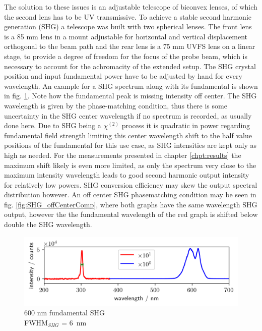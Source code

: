 \documentclass[twoside,openright]{scrreprt}
\begin{document}
The solution to these issues is an adjustable telescope of biconvex lenses, of which the second lens has to be UV transmissive. To achieve a stable second harmonic generation (SHG) a telescope was built with two spherical lenses. The front lens is a 85 mm lens in a mount adjustable for horizontal and vertical displacement orthogonal to the beam path and the rear lens is a 75 mm UVFS lens on a linear stage, to provide a degree of freedom for the focus of the probe beam, which is necessary to account for the achromacity of the extended setup. The SHG crystal position and input fundamental power have to be adjusted by hand for every wavelength. An example for a SHG spectrum along with its fundamental is shown in fig. \ref{fig:specSHG300nm}. Note how the fundamental peak is missing intensity off center. The SHG wavelength is given by the phase-matching condition, thus there is some uncertainty in the SHG center wavelength if no spectrum is recorded, as usually done here. Due to SHG being a $\chi^{\left(2\right)}$ process it is quadratic in power regarding fundamental field strength limiting this center wavelength shift to the half value positions of the fundamental for this use case, as SHG intensities are kept only as high as needed. For the measurements presented in chapter \ref{chpt:results} the maximum shift likely is even more limited, as only the spectrum very close to the maximum intensity wavelength leads to good second harmonic output intensity for relatively low powers. SHG conversion efficiency may skew the output spectral distribution however. An off center SHG phasematching condition may be seen in fig. \ref{fig:SHG_offCenterComp}, where both graphs have the same wavelength SHG output, however the the fundamental wavelength of the red graph is shifted below double the SHG wavelength. 
\begin{figure}[hbtp]
\centering
\includegraphics[scale=1]{images/spectra/SpectrumExampleNoFilter_300nm.png}
\caption{600 nm fundamental SHG\label{fig:specSHG300nm}\\ FWHM$_{SHG}$ = \SI{6}{\nano\meter}}
\end{figure}
\end{document}
